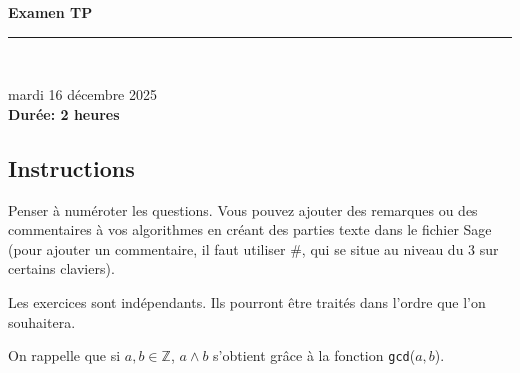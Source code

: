 \documentclass[11pt,a4paper]{article}
\title{}
\date{}
\newcommand{\HRule}{\rule{\linewidth}{0.5mm}}
\newcommand{\Z}{\mathbb{Z}}
\begin{document}
\pagestyle{fancy}

\fancyhead{}
 \fancyfoot{}




\newcommand{\lb}{\llbracket}
\newcommand{\rb}{\rrbracket}

\newcommand{\md}[3]{#1 \equiv #2 \! \! \! \! \! \pmod {#3} }
\newcommand{\nmd}[3]{#1 \not \equiv #2 \! \! \! \! \!  \pmod #3 }
\newcommand{\mda}[3]{#1 \equiv #2 \! \!  \pmod #3 }
\newcommand{\nmda}[3]{#1 \not \equiv #2 \! \! \pmod #3 }
\newcommand{\mo}[2]{#1 \! \! \! \! \! \pmod #2 }
\newcommand{\moa}[2]{#1 \! \! \pmod #2 }
\thispagestyle{fancy}

\vspace*{-0.9cm}
\begin{center}
    { \huge \bfseries
    Examen TP
     \\ [0cm] }
    \HRule \\[0.5cm]
\end{center}

\begin{center}
 mardi 16 décembre 2025 \\
\textbf{Durée: 2 heures}
\end{center}


\subsection*{Instructions}


Penser à numéroter les questions. Vous pouvez ajouter des remarques ou des commentaires à vos algorithmes en créant des parties texte dans le fichier Sage (pour ajouter un commentaire, il faut utiliser \#, qui se situe au niveau du $3$ sur certains claviers).

Les exercices sont indépendants. Ils pourront être traités dans l'ordre que l'on souhaitera. 

On rappelle que si $a,b\in \Z$, $a\wedge b$ s'obtient grâce à la fonction \texttt{gcd}($a,b$).
\end{document}
